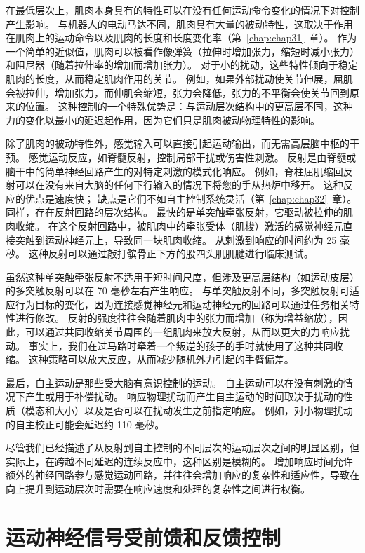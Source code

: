 在最低层次上，肌肉本身具有的特性可以在没有任何运动命令变化的情况下对控制产生影响。
与机器人的电动马达不同，肌肉具有大量的被动特性，这取决于作用在肌肉上的运动命令以及肌肉的长度和长度变化率（第~\ref{chap:chap31}~章）。
作为一个简单的近似值，肌肉可以被看作像弹簧（拉伸时增加张力，缩短时减小张力）和阻尼器（随着拉伸率的增加而增加张力）。
对于小的扰动，这些特性倾向于稳定肌肉的长度，从而稳定肌肉作用的关节。
例如，如果外部扰动使关节伸展，屈肌会被拉伸，增加张力，而伸肌会缩短，张力会降低，张力的不平衡会使关节回到原来的位置。
这种控制的一个特殊优势是：与运动层次结构中的更高层不同，这种力的变化以最小的延迟起作用，因为它们只是肌肉被动物理特性的影响。


除了肌肉的被动特性外，感觉输入可以直接引起运动输出，而无需高层脑中枢的干预。
感觉运动反应，如脊髓反射，控制局部干扰或伤害性刺激。
反射是由脊髓或脑干中的简单神经回路产生的对特定刺激的模式化响应。
例如，脊柱屈肌缩回反射可以在没有来自大脑的任何下行输入的情况下将您的手从热炉中移开。
这种反应的优点是速度快；
缺点是它们不如自主控制系统灵活（第~\ref{chap:chap32}~章）。
同样，存在反射回路的层次结构。
最快的是单突触牵张反射，它驱动被拉伸的肌肉收缩。 
在这个反射回路中，被肌肉中的牵张受体（肌梭）激活的感觉神经元直接突触到运动神经元上，导致同一块肌肉收缩。
从刺激到响应的时间约为 25 毫秒。
这种反射可以通过敲打髌骨正下方的股四头肌肌腱进行临床测试。


虽然这种单突触牵张反射不适用于短时间尺度，但涉及更高层结构（如运动皮层）的多突触反射可以在 70 毫秒左右产生响应。
与单突触反射不同，多突触反射可适应行为目标的变化，因为连接感觉神经元和运动神经元的回路可以通过任务相关特性进行修改。
反射的强度往往会随着肌肉中的张力而增加（称为增益缩放），因此，可以通过共同收缩关节周围的一组肌肉来放大反射，从而以更大的力响应扰动。
事实上，我们在过马路时牵着一个叛逆的孩子的手时就使用了这种共同收缩。
这种策略可以放大反应，从而减少随机外力引起的手臂偏差。


最后，自主运动是那些受大脑有意识控制的运动。
自主运动可以在没有刺激的情况下产生或用于补偿扰动。
响应物理扰动而产生自主运动的时间取决于扰动的性质（模态和大小）以及是否可以在扰动发生之前指定响应。
例如，对小物理扰动的自主校正可能会延迟约 110 毫秒。


尽管我们已经描述了从反射到自主控制的不同层次的运动层次之间的明显区别，但实际上，在跨越不同延迟的连续反应中，这种区别是模糊的。
增加响应时间允许额外的神经回路参与感觉运动回路，并往往会增加响应的复杂性和适应性，导致在向上提升到运动层次时需要在响应速度和处理的复杂性之间进行权衡。



\section{运动神经信号受前馈和反馈控制}

